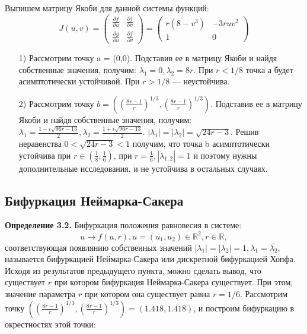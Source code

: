 \documentclass[11pt]{article}
\begin{document}
	{Выпишем матрицу Якоби для данной системы функций:}
	\[ J(u,v) = \begin{pmatrix}
	\frac{\partial f}{\partial u}& \frac{\partial f}{\partial v} \\
	\frac{\partial g}{\partial u}& \frac{\partial f}{\partial v}
	\end{pmatrix} = \begin{pmatrix}
	r(8 - v^3)& -3ruv^2 \\
	1 & 0
	\end{pmatrix} \]
	\begin{itemize}
		\item [1)]{Рассмотрим точку a = (0,0). Подставив ее в матрицу Якоби и найдя собственные значения, получим: $\lambda_1 = 0, \lambda_2 = 8r.$ При $r < 1/8$ точка а будет асимптотически устойчивой. При $r > 1/8$ --- неустойчива.}
		\item [2)]{Рассмотрим точку $ b = ((\frac{8r - 1}{r})^{1/3}, (\frac{8r - 1}{r})^{1/3}).$ Подставив ее в матрицу Якоби и найдя собственные значения, получим: $\lambda_1 = \frac{1 - i\sqrt{96r - 13}}{2}, \lambda_2 = \frac{1 + i\sqrt{96r - 13}}{2}.$ $|\lambda_1| = |\lambda_2| = \sqrt{24r - 3}.$ Решив неравенства  $0 < \sqrt{24r - 3} < 1$ получим, что точка b асимптотически устойчива при $r \in (\frac{1}{8}, \frac{1}{6})$, при $r = \frac{1}{6}, |\lambda_{1,2}| = 1$ и поэтому нужны дополнительные исследования, и не устойчива в остальных случаях.}
	\end{itemize}
 	{\subsection{Бифуркация Неймарка-Сакера}}
 	{\textbf{Определение 3.2.} Бифуркация положения равновесия в системе:}
 	\[ u \rightarrow f(u,r), u = (u_1, u_2) \in \mathds{R}^2, r \in \mathds{R},\] 
 	{соответствующая появлянию собственных значений $|\lambda_1| = |\lambda_2| = 1, \lambda_1 = \overline{\lambda_2},$ называется бифуркацией Неймарка-Сакера или дискретной бифуркацией Хопфа.}
 	\newline
 	{Исходя из результатов предыдущего пункта, можно сделать вывод, что существует $r$ при котором бифуркация Неймарка-Сакера существует. При этом, значение параметра $r$ при котором она существует равна $r = 1/6.$}
 	\newline
 	{Рассмотрим точку $((\frac{8r - 1}{r})^{1/3}, (\frac{8r - 1}{r})^{1/3}) = (1.418, 1.418)$, и построим бифуркацию в окрестностях этой точки:}
\end{document}
